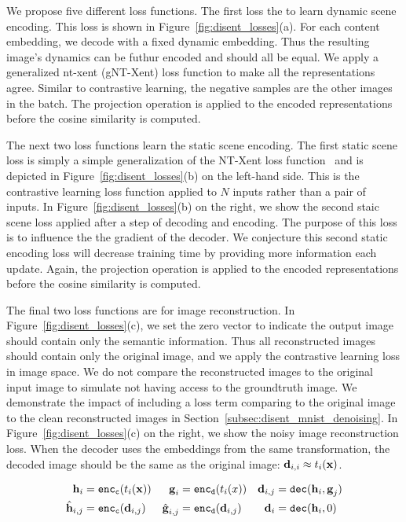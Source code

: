 \documentclass[11pt]{article}
\begin{document}
We propose five different loss functions. The first loss the to learn dynamic scene encoding. This loss is shown in Figure~\ref{fig:disent_losses}(a). For each content embedding, we decode with a fixed dynamic embedding. Thus the resulting image's dynamics can be futhur encoded and should all be equal. We apply a generalized nt-xent (gNT-Xent) loss function to make all the representations agree. Similar to contrastive learning, the negative samples are the other images in the batch. The projection operation is applied to the encoded representations before the cosine similarity is computed.

The next two loss functions learn the static scene encoding. The first static scene loss is simply a simple generalization of the NT-Xent loss function~\cite{chen2020simple} and is depicted in Figure~\ref{fig:disent_losses}(b) on the left-hand side. This is the contrastive learning loss function applied to $N$ inputs rather than a pair of inputs. In Figure~\ref{fig:disent_losses}(b) on the right, we show the second staic scene loss applied after a step of decoding and encoding. The purpose of this loss is to influence the the gradient of the decoder. We conjecture this second static encoding loss will decrease training time by providing more information each update. Again, the projection operation is applied to the encoded representations before the cosine similarity is computed.
 
The final two loss functions are for image reconstruction. In Figure~\ref{fig:disent_losses}(c), we set the zero vector to indicate the output image should contain only the semantic information. Thus all reconstructed images should contain only the original image, and we apply the contrastive learning loss in image space. We do not compare the reconstructed images to the original input image to simulate not having access to the groundtruth image. We demonstrate the impact of including a loss term comparing to the original image to the clean reconstructed images in Section~\ref{subsec:disent_mnist_denoising}. In Figure~\ref{fig:disent_losses}(c) on the right, we show the noisy image reconstruction loss. When the decoder uses the embeddings from the same transformation, the decoded image should be the same as the original image: $\boldsymbol{\mathrm{d}}_{i,i} \approx t_i(\boldsymbol{\mathrm{x}})$. 


\begin{align}\label{eq:repr}
  \boldsymbol{\mathrm{h}}_i &= {\tt enc_c}(t_i(\boldsymbol{\mathrm{x}})) &  \boldsymbol{\mathrm{g}}_i &= {\tt enc_d}(t_i(x)) &  \boldsymbol{\mathrm{d}}_{i,j} &= {\tt dec}(\boldsymbol{\mathrm{h}}_i,\boldsymbol{\mathrm{g}}_j)
  \\\nonumber
  \hat{\boldsymbol{\mathrm{h}}}_{i,j} &= {\tt enc_c}(\boldsymbol{\mathrm{d}}_{i,j}) & \hat{\boldsymbol{\mathrm{g}}}_{i,j} &= {\tt enc_d}(\boldsymbol{\mathrm{d}}_{i,j}) & \boldsymbol{\mathrm{d}}_i &= {\tt dec}(\boldsymbol{\mathrm{h}}_i,0)
\end{align}
\end{document}
